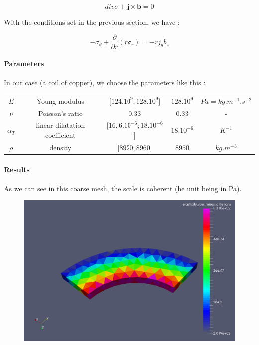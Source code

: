 \documentclass[11pt]{amsart}
\begin{document}
\[
div\sigma+\textbf{j}\times\textbf{b}=0
\]



With the conditions set in the previous section, we have :



\[
-\sigma_{\theta}+\frac{\partial}{\partial r}(r\sigma_{r})=-rj_{\theta}b_{z}
\]



\hypertarget{x-parameters}{\paragraph{Parameters}}
In our case (a coil of copper), we choose the parameters like this :


\begin{center}
\begin{tabular}{|c|c|c|c|c|}
\hline
$E$ & Young modulus & $[124.10^{9} ;128.10^{9}$] & $128.10^{9}$ & $Pa=kg.m^{-1} .s^{-2}$ \\ 
$\nu$ & Poisson’s ratio & 0.33 & 0.33 & - \\ 
$\alpha_{T}$ & linear dilatation coefficient & $[16,6.10^{-6} ;18.10^{-6}$] & $18.10^{-6}$ & $K^{-1}$ \\ 
$\rho$ & density & $[8920;8960$] & $8950$ & $kg.m^{-3}$ \\ 
\hline
\end{tabular}
\end{center}

\hypertarget{x-results}{\paragraph{Results}}
As we can see in this coarse mesh, the scale is coherent (he unit being in Pa).


\begin{figure}
\centering\includegraphics[width=4.75truein]{./images/learning/elasticity/Coarse_Von-Mises.png}


\end{figure}
\end{document}
